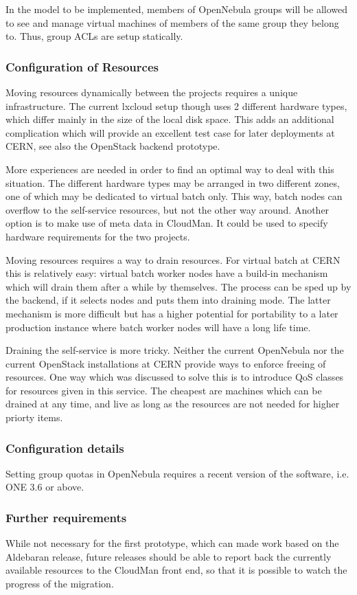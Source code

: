 In the model to be implemented, members of OpenNebula groups will be allowed to see and manage virtual machines of members of the same group they belong to. Thus, group ACLs are setup statically.

\subsubsection{Configuration of Resources}
Moving resources dynamically between the projects requires a unique infrastructure. The current lxcloud setup though uses 2 different hardware 
types, which differ mainly in the size of the local disk space. This adds an additional complication which will provide an excellent test case for
later deployments at CERN, see also the OpenStack backend prototype. 

More experiences are needed in order to find an optimal way to deal with this situation. The different hardware types may be arranged in 
two different zones, one of which may be dedicated to virtual batch only. This way, batch nodes can overflow to the self-service resources, but not
the other way around. Another option is to make use of meta data in CloudMan. It could be used to specify hardware requirements for the two projects.

Moving resources requires a way to drain resources. For virtual batch at CERN this is relatively easy: virtual batch worker nodes have a 
build-in mechanism which will drain them after a while by themselves. The process can be sped up by the backend, if it selects nodes and puts them 
into draining mode. The latter mechanism is more difficult but has a higher potential for portability to a later production instance where batch 
worker nodes will have a long life time. 

Draining the self-service is more tricky. Neither the current OpenNebula nor the current OpenStack installations at CERN provide ways to enforce 
freeing of resources. One way which was discussed to solve this is to introduce QoS classes for resources given in this service. The cheapest 
are machines which can be drained at any time, and live as long as the resources are not needed for higher priorty items. 

\subsubsection{Configuration details}
Setting group quotas in OpenNebula requires a recent version of the software, i.e. ONE 3.6 or above. 




\subsubsection{Further requirements}
While not necessary for the first prototype, which can made work based on the Aldebaran release, future releases should be able to report back the currently available resources to the CloudMan front end, so that it is possible to watch the progress of the migration. 
